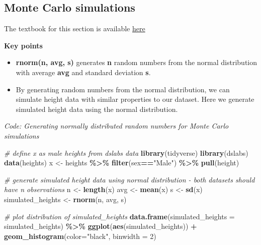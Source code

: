 \documentclass[
]{article}
\newenvironment{Shaded}{\begin{snugshade}}{\end{snugshade}}
\newcommand{\CommentTok}[1]{\textcolor[rgb]{0.56,0.35,0.01}{\textit{#1}}}
\newcommand{\DataTypeTok}[1]{\textcolor[rgb]{0.13,0.29,0.53}{#1}}
\newcommand{\DecValTok}[1]{\textcolor[rgb]{0.00,0.00,0.81}{#1}}
\newcommand{\KeywordTok}[1]{\textcolor[rgb]{0.13,0.29,0.53}{\textbf{#1}}}
\newcommand{\NormalTok}[1]{#1}
\newcommand{\OperatorTok}[1]{\textcolor[rgb]{0.81,0.36,0.00}{\textbf{#1}}}
\newcommand{\StringTok}[1]{\textcolor[rgb]{0.31,0.60,0.02}{#1}}
\providecommand{\tightlist}{%
  \setlength{\itemsep}{0pt}\setlength{\parskip}{0pt}}
\begin{document}
\hypertarget{monte-carlo-simulations-1}{%
\subsection{Monte Carlo simulations}\label{monte-carlo-simulations-1}}

The textbook for this section is available
\href{https://rafalab.github.io/dsbook/probability.html\#monte-carlo-simulations-for-continuous-variables}{here}

\textbf{Key points}

\begin{itemize}
\tightlist
\item
  \textbf{rnorm(n, avg, s)} generates \textbf{n} random numbers from the
  normal distribution with average \textbf{avg} and standard deviation
  \textbf{s}.
\item
  By generating random numbers from the normal distribution, we can
  simulate height data with similar properties to our dataset. Here we
  generate simulated height data using the normal distribution.
\end{itemize}

\emph{Code: Generating normally distributed random numbers for Monte
Carlo simulations}

\begin{Shaded}
\begin{Highlighting}[]
\CommentTok{\# define x as male heights from dslabs data}
\KeywordTok{library}\NormalTok{(tidyverse)}
\KeywordTok{library}\NormalTok{(dslabs)}
\KeywordTok{data}\NormalTok{(heights)}
\NormalTok{x \textless{}{-}}\StringTok{ }\NormalTok{heights }\OperatorTok{\%\textgreater{}\%}\StringTok{ }\KeywordTok{filter}\NormalTok{(sex}\OperatorTok{==}\StringTok{"Male"}\NormalTok{) }\OperatorTok{\%\textgreater{}\%}\StringTok{ }\KeywordTok{pull}\NormalTok{(height)}

\CommentTok{\# generate simulated height data using normal distribution {-} both datasets should have n observations}
\NormalTok{n \textless{}{-}}\StringTok{ }\KeywordTok{length}\NormalTok{(x)}
\NormalTok{avg \textless{}{-}}\StringTok{ }\KeywordTok{mean}\NormalTok{(x)}
\NormalTok{s \textless{}{-}}\StringTok{ }\KeywordTok{sd}\NormalTok{(x)}
\NormalTok{simulated\_heights \textless{}{-}}\StringTok{ }\KeywordTok{rnorm}\NormalTok{(n, avg, s)}

\CommentTok{\# plot distribution of simulated\_heights}
\KeywordTok{data.frame}\NormalTok{(}\DataTypeTok{simulated\_heights =}\NormalTok{ simulated\_heights) }\OperatorTok{\%\textgreater{}\%}
\StringTok{    }\KeywordTok{ggplot}\NormalTok{(}\KeywordTok{aes}\NormalTok{(simulated\_heights)) }\OperatorTok{+}
\StringTok{    }\KeywordTok{geom\_histogram}\NormalTok{(}\DataTypeTok{color=}\StringTok{"black"}\NormalTok{, }\DataTypeTok{binwidth =} \DecValTok{2}\NormalTok{)}
\end{Highlighting}
\end{Shaded}
\end{document}

